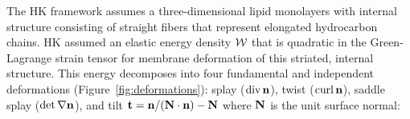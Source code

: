 
The HK framework assumes a three-dimensional lipid monolayers with internal structure
consisting of straight fibers that represent elongated hydrocarbon chains. HK assumed an
elastic energy density ${\cal W}$ that is quadratic in the Green-Lagrange strain tensor for membrane deformation of
this striated, internal structure.
%
%
%
%
%
This energy decomposes into four fundamental and independent
deformations (Figure~\ref{fig:deformations}): splay ($\operatorname{div} {\bf n}$),
twist ($\operatorname{curl} {\bf n}$), saddle splay ($\det \nabla {\bf n}$), and tilt
${\bf t}={\bf n}/({\bf N}\cdot {\bf n}) - {\bf N}$ where ${\bf N}$ is
the unit surface normal:
